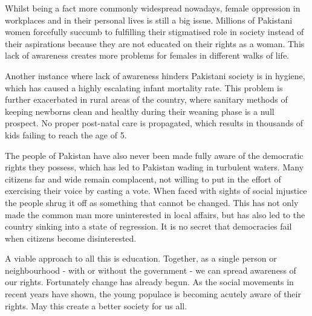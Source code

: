 \documentclass{article}
\begin{document}
Whilst being a fact more commonly widespread nowadays, female oppression in workplaces and in their personal lives is still a big issue. Millions of Pakistani women forcefully succumb to fulfilling their stigmatised role in society instead of their aspirations because they are not educated on their rights as a woman. This lack of awareness creates more problems for females in different walks of life.

Another instance where lack of awareness hinders Pakistani society is in hygiene, which has caused a highly escalating infant mortality rate. This problem is further exacerbated in rural areas of the country, where sanitary methods of keeping newborns clean and healthy during their weaning phase is a null prospect. No proper post-natal care is propagated, which results in thousands of kids failing to reach the age of 5. 

The people of Pakistan have also never been made fully aware of the democratic rights they possess, which has led to Pakistan wading in turbulent waters. Many citizens far and wide remain complacent, not willing to put in the effort of exercising their voice by casting a vote. When faced with sights of social injustice the people shrug it off as something that cannot be changed. This has not only made the common man more uninterested in local affairs, but has also led to the country sinking into a state of regression. It is no secret that democracies fail when citizens become disinterested. 

A viable approach to all this is education. Together, as a single person or neighbourhood - with or without the government - we can spread awareness of our rights. Fortunately change has already begun. As the social movements in recent years have shown, the young populace is becoming acutely aware of their rights. May this create a better society for us all.


\closearticle
\end{document}
